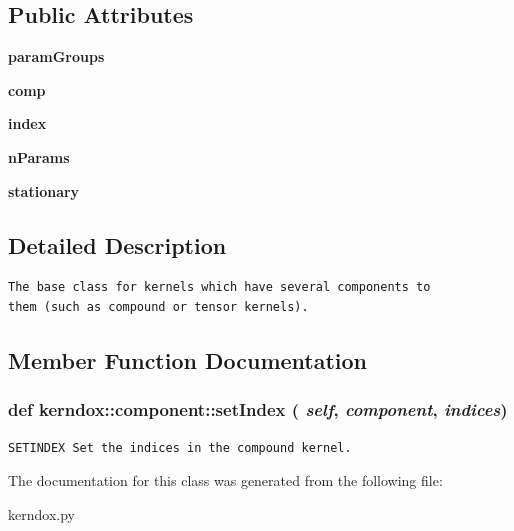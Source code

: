 \subsection*{Public Attributes}
\begin{CompactItemize}
\item 
\hypertarget{classkerndox_1_1component_196cedc7ce3fd9f482257fff9f59b804}{
\textbf{paramGroups}}
\label{classkerndox_1_1component_196cedc7ce3fd9f482257fff9f59b804}

\item 
\hypertarget{classkerndox_1_1component_4d80eb59597aabe350fa28b5397d6593}{
\textbf{comp}}
\label{classkerndox_1_1component_4d80eb59597aabe350fa28b5397d6593}

\item 
\hypertarget{classkerndox_1_1component_cdfd1f2425d9eb288ce146e9aba8b8bc}{
\textbf{index}}
\label{classkerndox_1_1component_cdfd1f2425d9eb288ce146e9aba8b8bc}

\item 
\hypertarget{classkerndox_1_1component_dc0c595f558a6eb7e0f45bcaf067db2e}{
\textbf{nParams}}
\label{classkerndox_1_1component_dc0c595f558a6eb7e0f45bcaf067db2e}

\item 
\hypertarget{classkerndox_1_1component_64b94412916357ce307f23dbb937bac6}{
\textbf{stationary}}
\label{classkerndox_1_1component_64b94412916357ce307f23dbb937bac6}

\end{CompactItemize}


\subsection{Detailed Description}


\footnotesize\begin{verbatim}The base class for kernels which have several components to
them (such as compound or tensor kernels).

\end{verbatim}
\normalsize
 

\subsection{Member Function Documentation}
\hypertarget{classkerndox_1_1component_9ccd80184cbfcf0d09da6f30a3f807ea}{
\subsubsection[{setIndex}]{\setlength{\rightskip}{0pt plus 5cm}def kerndox::component::setIndex ( {\em self}, \/   {\em component}, \/   {\em indices})}}
\label{classkerndox_1_1component_9ccd80184cbfcf0d09da6f30a3f807ea}




\footnotesize\begin{verbatim}SETINDEX Set the indices in the compound kernel.

\end{verbatim}
\normalsize
 

The documentation for this class was generated from the following file:\begin{CompactItemize}
\item 
kerndox.py\end{CompactItemize}

